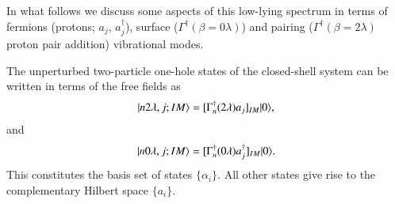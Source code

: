 In what follows we discuss some aspects of this low-lying spectrum  in terms of fermions (protons; $a_j$, $a_j^\dagger$), surface ($\Gamma^\dagger(\beta=0\lambda)$) and pairing ($\Gamma^\dagger(\beta=2\lambda)$ proton pair addition) vibrational modes. 

The unperturbed two-particle one-hole states of the closed-shell system can be written in terms of the free fields as 
  \begin{align}\label{eqC1A81} 
   |{n2\lambda,j;IM} \rangle=[\Gamma^\dagger_n(2\lambda)a_j]_{IM}|{0} \rangle,
    \end{align}  
and 
  \begin{align}\label{eqC1A82} 
   |{n0\lambda,j;IM} \rangle=[\Gamma^\dagger_n(0\lambda)a^\dagger_j]_{IM}|{0} \rangle.
    \end{align}   
This constitutes the basis set of states $\{\alpha_i\}$. All other states give rise to the complementary Hilbert space $\{a_i\}$. 


